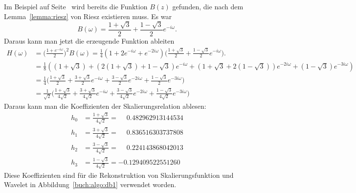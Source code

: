 Im Beispiel auf Seite~\pageref{buch:kompakt:db2riesz} wird bereits
die Funktion $B(z)$ gefunden, die nach dem Lemma~\ref{lemma:riesz}
von Riesz existieren muss.
Es war
\[
B(\omega)
=
\frac{1+\sqrt{3}}2 + \frac{1-\sqrt{3}}2e^{-i\omega}.
\]
Daraus kann man jetzt die erzeugende Funktion ableiten
\begin{align*}
H(\omega)
&=
\biggl(\frac{1+e^{-i\omega}}2\biggr)^2 B(\omega)
=
\frac14(1+2e^{-i\omega}+e^{-2i\omega})
\biggl(
\frac{1+\sqrt{3}}2 + \frac{1-\sqrt{3}}2e^{-i\omega}
\biggr).
\\
&=
\frac18(
(1+\sqrt{3})
+
(2(1+\sqrt{3})+1-\sqrt{3}) e^{-i\omega}
+
(1+\sqrt{3}+2(1-\sqrt{3})) e^{-2i\omega}
+
(1-\sqrt{3})e^{-3i\omega}
)
\\
&=
\frac14\biggl(
\frac{1+\sqrt{3}}2
+
\frac{3+\sqrt{3}}2 e^{-i\omega}
+
\frac{3-\sqrt{3}}2 e^{-2i\omega}
+
\frac{1-\sqrt{3}}2 e^{-3i\omega}
\biggr)
\\
&=
\frac1{\sqrt{2}}
\biggl(
\frac{1+\sqrt{3}}{4\sqrt{2}}
+
\frac{3+\sqrt{3}}{4\sqrt{2}} e^{-i\omega}
+
\frac{3-\sqrt{3}}{4\sqrt{2}} e^{-2i\omega}
+
\frac{1-\sqrt{3}}{4\sqrt{2}} e^{-3i\omega}
\biggr)
\end{align*}
Daraus kann man die Koeffizienten der Skalierungsrelation ablesen:
\begin{align*}
h_0
&=
\frac{1+\sqrt{3}}{4\sqrt{2}}
=
\phantom{-}
0.482962913144534
\\
h_1
&=
\frac{3+\sqrt{3}}{4\sqrt{2}}
=
\phantom{-}
0.836516303737808
\\
h_2
&=
\frac{3-\sqrt{3}}{4\sqrt{2}}
=
\phantom{-}
0.224143868042013
\\
h_3
&=
\frac{1-\sqrt{3}}{4\sqrt{2}}
=
-0.129409522551260
\end{align*}
Diese Koeffizienten sind für die Rekonstruktion von
Skalierungsfunktion und Wavelet in Abbildung~\ref{buch:algo:db1}
verwendet worden.

